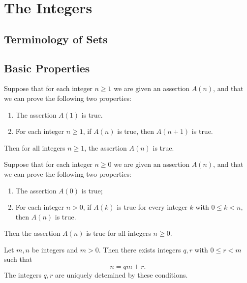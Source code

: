 \chapter{The Integers}


\section{Terminology of Sets}


\section{Basic Properties}


\begin{theorem}
	Suppose that for each integer $n \ge 1$ we are given an assertion $A(n)$, and that we can prove the following two properties:
	\begin{enumerate}[(1)]
		\item The assertion $A(1)$ is true.
		\item For each integer $n \ge 1$, if $A(n)$ is true, then $A(n + 1)$ is true.
	\end{enumerate}
	Then for all integers $n \ge 1$, the assertion $A(n)$ is true.
\end{theorem}


\begin{theorem}
	Suppose that for each integer $n \ge 0$ we are given an assertion $A(n)$, and that we can prove the following two properties:
	\begin{enumerate}[(i')]
		\item The assertion $A(0)$ is true;
		\item For each integer $n > 0$, if $A(k)$ is true for every integer $k$ with $0 \le k < n$, then $A(n)$ is true.
	\end{enumerate}
	Then the assertion $A(n)$ is true for all integers $n \ge 0$.
\end{theorem}


\begin{theorem}
	Let $m,n$ be integers and $m > 0$. Then there exists integers $q,r$ with $0\le r < m$ such that
	$$
	n = qm + r.
	$$
	The integers $q,r$ are uniquely detemined by these conditions.
\end{theorem}


